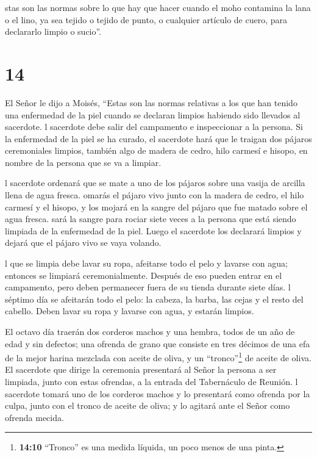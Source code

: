  stas son las normas sobre lo que hay que hacer cuando el
moho contamina la lana o el lino, ya sea tejido o tejido de punto, o
cualquier artículo de cuero, para declararlo limpio o sucio''.

\hypertarget{section-13}{%
\section{14}\label{section-13}}

 El Señor le dijo a Moisés,  ``Estas son las
normas relativas a los que han tenido una enfermedad de la piel cuando
se declaran limpios habiendo sido llevados al sacerdote.  l
sacerdote debe salir del campamento e inspeccionar a la persona. Si la
enfermedad de la piel se ha curado,  el sacerdote hará que
le traigan dos pájaros ceremoniales limpios, también algo de madera de
cedro, hilo carmesí e hisopo, en nombre de la persona que se va a
limpiar.

 l sacerdote ordenará que se mate a uno de los pájaros sobre
una vasija de arcilla llena de agua fresca.  omarás el
pájaro vivo junto con la madera de cedro, el hilo carmesí y el hisopo, y
los mojará en la sangre del pájaro que fue matado sobre el agua fresca.
 sará la sangre para rociar siete veces a la persona que
está siendo limpiada de la enfermedad de la piel. Luego el sacerdote los
declarará limpios y dejará que el pájaro vivo se vaya volando.

 l que se limpia debe lavar su ropa, afeitarse todo el pelo
y lavarse con agua; entonces se limpiará ceremonialmente. Después de eso
pueden entrar en el campamento, pero deben permanecer fuera de su tienda
durante siete días.  l séptimo día se afeitarán todo el
pelo: la cabeza, la barba, las cejas y el resto del cabello. Deben lavar
su ropa y lavarse con agua, y estarán limpios.

 El octavo día traerán dos corderos machos y una hembra,
todos de un año de edad y sin defectos; una ofrenda de grano que
consiste en tres décimos de una efa de la mejor harina mezclada con
aceite de oliva, y un ``tronco''\footnote{\textbf{14:10} ``Tronco'' es
  una medida líquida, un poco menos de una pinta.} de aceite de oliva.
 El sacerdote que dirige la ceremonia presentará al Señor
la persona a ser limpiada, junto con estas ofrendas, a la entrada del
Tabernáculo de Reunión.  l sacerdote tomará uno de los
corderos machos y lo presentará como ofrenda por la culpa, junto con el
tronco de aceite de oliva; y lo agitará ante el Señor como ofrenda
mecida.


